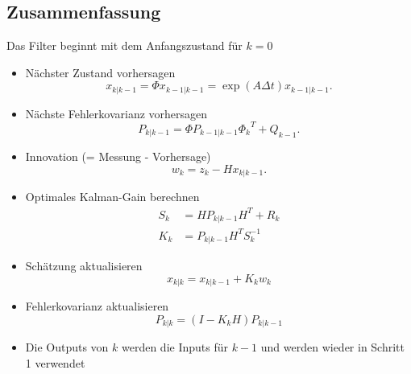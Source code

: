 \subsection{Zusammenfassung }

Das Filter beginnt mit dem Anfangszustand für $k=0$

\begin{itemize}
\item Nächster Zustand vorhersagen
\[
{x_{k|k-1}}=\Phi{x_{k-1|k-1}}= \exp(A\Delta t){x_{k-1|k-1}}.
\] 

 \item Nächste Fehlerkovarianz vorhersagen
\[
{P_{k|k-1}}=\Phi {P_{k-1|k-1}} {\Phi _{k}}^T + {Q_{k-1}}.
\] 

\item Innovation (= Messung -  Vorhersage)
\[
{w_{k}}={z_{k}}-{H}{x_{k|k-1}}.
\] 

\item Optimales Kalman-Gain berechnen
\begin{align*}
{S_{k}} &={H}{P_{k|k-1}}{H}^T+{R_{k}}\\
{K_{k}} &= {P_{k|k-1}} {H^T}{S_{k}^{-1}}
\end{align*}

\item Schätzung aktualisieren
\[
{x_{k|k}}={x_{k|k-1}}+{K_{k}}{w_{k}}
\] 

\item Fehlerkovarianz aktualisieren
\[
{P_{k|k}}=(I-{K_{k}}{H}){P_{k|k-1}}
\] 

\item Die Outputs von $k$ werden die Inputs für ${k-1}$ und werden wieder in Schritt 1 verwendet
\end{itemize}

